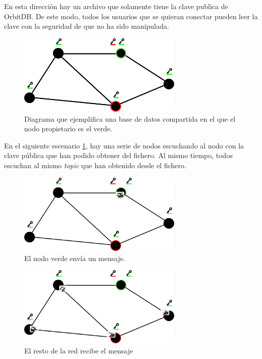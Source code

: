 En esta dirección hay un archivo que solamente tiene la clave publica de OrbitDB. De este modo, todos los usuarios que se quieran conectar pueden leer la clave con la seguridad de que no ha sido manipulada.
\begin{figure}[H]
    \centering
    \includegraphics[width=0.7\textwidth]{Figures/OrbitDB.png}
    \caption[Diagrama básico de conexión de OrbitDB]{Diagrama que ejemplifica una base de datos compartida en el que el nodo propietario es el verde.}
    \label{fg:orbit}
\end{figure}
En el siguiente escenario \ref{fg:orbit}, hay una serie de nodos escuchando al nodo con la clave pública que han podido obtener del fichero. Al mismo tiempo, todos escuchan al mismo \textit{topic} que han obtenido desde el fichero.
\begin{figure}[h!]
    \centering
    \includegraphics[width=0.7\textwidth]{Figures/Message sent.png}
    \caption{El nodo verde envía un mensaje.}
    \label{fg:messageSent}
\end{figure}
\begin{figure}[h!]
    \centering
    \includegraphics[width=0.7\textwidth]{Figures/Message arived.png}
    \caption{El resto de la red recibe el mensaje}
    \label{fg:messageRecived}
\end{figure}
